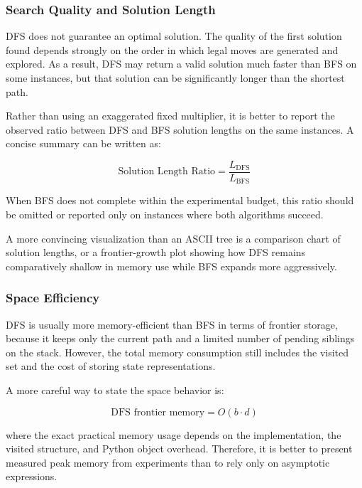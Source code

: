 \documentclass{article}
\begin{document}
\subsubsection{Search Quality and Solution Length}

DFS does not guarantee an optimal solution. The quality of the first solution found depends strongly on the order in which legal moves are generated and explored. As a result, DFS may return a valid solution much faster than BFS on some instances, but that solution can be significantly longer than the shortest path.

Rather than using an exaggerated fixed multiplier, it is better to report the observed ratio between DFS and BFS solution lengths on the same instances. A concise summary can be written as:

\begin{equation}
\text{Solution Length Ratio} = \frac{L_{\text{DFS}}}{L_{\text{BFS}}}
\end{equation}

When BFS does not complete within the experimental budget, this ratio should be omitted or reported only on instances where both algorithms succeed.

A more convincing visualization than an ASCII tree is a comparison chart of solution lengths, or a frontier-growth plot showing how DFS remains comparatively shallow in memory use while BFS expands more aggressively.

\subsubsection{Space Efficiency}

DFS is usually more memory-efficient than BFS in terms of frontier storage, because it keeps only the current path and a limited number of pending siblings on the stack. However, the total memory consumption still includes the visited set and the cost of storing state representations.

A more careful way to state the space behavior is:

\begin{equation}
\text{DFS frontier memory} = O(b \cdot d)
\end{equation}

where the exact practical memory usage depends on the implementation, the visited structure, and Python object overhead. Therefore, it is better to present measured peak memory from experiments than to rely only on asymptotic expressions.
\end{document}
